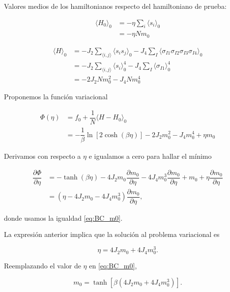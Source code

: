 \documentclass[10pt]{article}
\begin{document}
Valores medios de los hamiltonianos respecto del hamiltoniano de prueba:

\begin{align}
\langle H_0 \rangle_0 &= -\eta \sum_i \langle s_i \rangle_0  \nonumber \\
&= -\eta N m_0 
\end{align}

\begin{align}
\langle H \rangle_0 &= -J_2 \sum_{\langle i,j\rangle} \langle s_i s_j \rangle_0 - J_4 \sum_I \langle\sigma_{I1}\sigma_{I2}\sigma_{I3}\sigma_{I4} \rangle_0 \nonumber \\
&= -J_2 \sum_{\langle i,j\rangle} \langle s_i\rangle_0^4 - J_4 \sum_I \langle\sigma_{I1}\rangle_0^4  \nonumber \\
&= -2 J_2 N m_0^2 - J_4 N m_0^4 \nonumber
\end{align}

Proponemos la funci\'on variacional 

\begin{align} \label{eq:BC_Phi}
\Phi(\eta) &= f_0 + \dfrac{1}{N} \langle H - H_0 \rangle_0 \nonumber \\
&= -\dfrac{1}{\beta} \ln \left[2 \cosh\left(\beta \eta\right) \right] -2 J_2 m_0^2 - J_4 m_0^4 + \eta m_0
\end{align}

Derivamos con respecto a $\eta$ e igualamos a cero para hallar el m\'inimo

\begin{align}
\dfrac{\partial \Phi}{\partial \eta} &= - \tanh\left(\beta \eta\right) - 4 J_2 m_0 \dfrac{\partial m_0}{\partial \eta} - 4 J_4 m_0^3 \dfrac{\partial m_0}{\partial \eta} + m_0 + \eta \dfrac{\partial m_0}{\partial \eta} \nonumber \\
&= \left(\eta - 4 J_2 m_0 - 4 J_4 m_0^3\right) \dfrac{\partial m_0}{\partial \eta},
\end{align}

donde usamos la igualdad \ref{eq:BC_m0}.

La expresi\'on anterior implica que la soluci\'on al problema variacional es 

\begin{equation}\label{eq:eta}
\eta = 4 J_2 m_0 + 4 J_4 m_0^3.
\end{equation}

Reemplazando el valor de $\eta$ en \ref{eq:BC_m0},

\begin{equation}
m_0 = \tanh\left[\beta (4 J_2 m_0 + 4 J_4 m_0^3)\right].
\end{equation}
\end{document}
